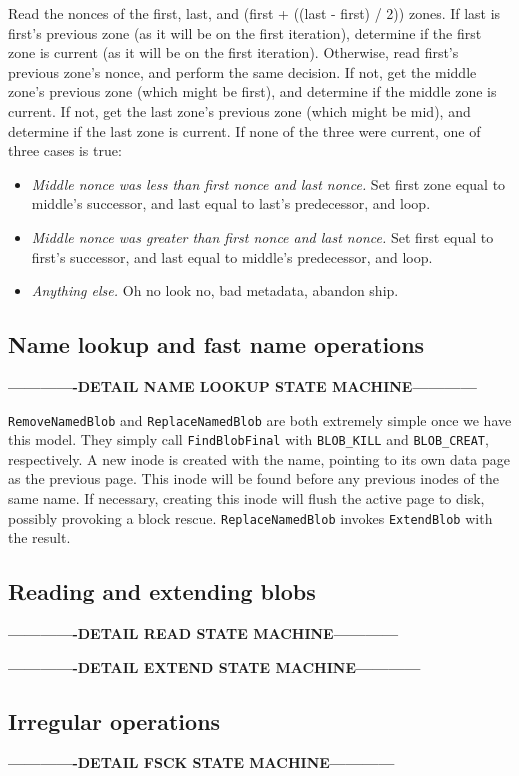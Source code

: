 \documentclass[letterpaper,10pt]{article}
\newenvironment{denseitemize}{
  \begin{itemize}
      \setlength{\itemsep}{0pt}
}{
  \end{itemize}
}
\begin{document}
Read the nonces of the first, last, and (first + ((last - first) / 2)) zones.
If last is first's previous zone (as it will be on the first iteration),
determine if the first zone is current (as it will be on the first iteration).
Otherwise, read first's previous zone's nonce, and perform the same
decision. If not, get the middle zone's previous zone (which might be first),
and determine if the middle zone is current. If not, get the last zone's previous
zone (which might be mid), and determine if the last zone is current. If none
of the three were current, one of three cases is true:
\begin{denseitemize}
\item \textit{Middle nonce was less than first nonce and last nonce.} Set first zone
  equal to middle's successor, and last equal to last's predecessor, and loop.
\item \textit{Middle nonce was greater than first nonce and last nonce.} Set
  first equal to first's successor, and last equal to middle's predecessor, and
  loop.
\item \textit{Anything else.} Oh no look no, bad metadata, abandon ship.
\end{denseitemize}

\subsection{Name lookup and fast name operations}
\textbf{-------------DETAIL NAME LOOKUP STATE MACHINE------------}

\texttt{RemoveNamedBlob} and \texttt{ReplaceNamedBlob} are both extremely
simple once we have this model. They simply call \texttt{FindBlobFinal} with
\texttt{BLOB\_KILL} and \texttt{BLOB\_CREAT}, respectively. A new inode is
created with the name, pointing to its own data page as the previous page.
This inode will be found before any previous inodes of the same name. If
necessary, creating this inode will flush the active page to disk, possibly
provoking a block rescue. \texttt{ReplaceNamedBlob} invokes \texttt{ExtendBlob}
with the result.

\subsection{Reading and extending blobs}
\textbf{-------------DETAIL READ STATE MACHINE------------}

\textbf{-------------DETAIL EXTEND STATE MACHINE------------}

\subsection{Irregular operations}
\textbf{-------------DETAIL FSCK STATE MACHINE------------}
\end{document}
